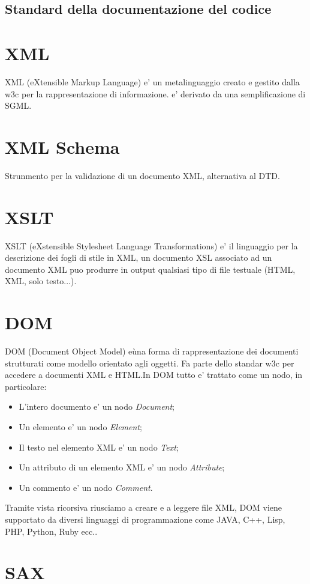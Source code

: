 \documentclass[11pt,titlepage,a4paper,twoside,openany]{book}
\begin{document}
\subsection{Standard della documentazione del codice}

\section{XML}
XML (eXtensible Markup Language) e' un metalinguaggio creato e gestito dalla w3c per la rappresentazione di informazione. e' derivato da una semplificazione di SGML.
\section{XML Schema}
Strunmento per la validazione di un documento XML, alternativa al DTD.
\section{XSLT}
XSLT (eXstensible Stylesheet Language Transformations) e' il linguaggio per la descrizione dei fogli di stile in XML, un documento XSL associato ad un documento XML puo produrre in output qualsiasi tipo di file testuale (HTML, XML, solo testo...).
\section{DOM}
DOM (Document Object Model) e\` una forma di rappresentazione dei documenti strutturati come modello orientato agli oggetti. Fa parte dello standar w3c per accedere a documenti XML e HTML.In DOM tutto e' trattato come un nodo, in particolare:
\begin{itemize}
\item L'intero documento e' un nodo \textit{Document};
\item Un elemento e' un nodo \textit{Element};
\item Il testo nel elemento XML e' un nodo \textit{Text};
\item Un attributo di un elemento XML e' un nodo \textit{Attribute};
\item Un commento e' un nodo \textit{Comment}.
\end{itemize}
Tramite vista ricorsiva riusciamo a creare e a leggere file XML, DOM viene supportato da diversi linguaggi di programmazione come JAVA, C++, Lisp, PHP, Python, Ruby ecc..

\section{SAX}
\end{document}
